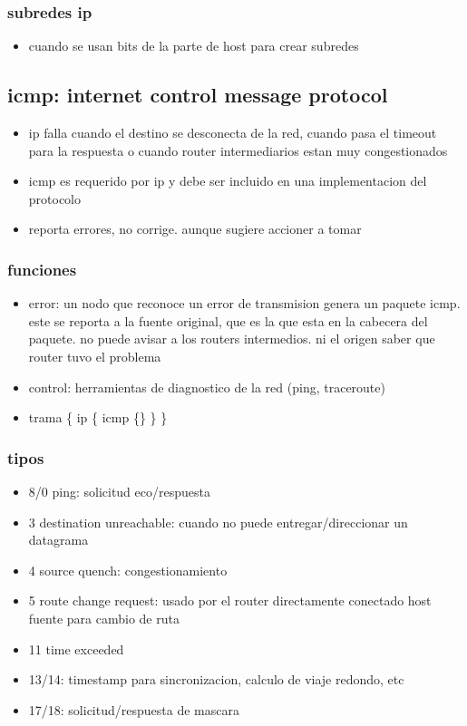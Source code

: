 \documentclass[11pt]{article}
\begin{document}
\subsubsection{subredes ip}
\label{sec:org59503a3}
\begin{itemize}
\item cuando se usan bits de la parte de host para crear subredes
\end{itemize}
\subsection{icmp: internet control message protocol}
\label{sec:org0bc4e59}
\begin{itemize}
\item ip falla cuando el destino se desconecta de la red, cuando pasa el timeout para la respuesta o cuando router intermediarios estan muy congestionados
\item icmp es requerido por ip y debe ser incluido en una implementacion del protocolo
\item reporta errores, no corrige. aunque sugiere accioner a tomar
\end{itemize}
\subsubsection{funciones}
\label{sec:org41250b2}
\begin{itemize}
\item error: un nodo que reconoce un error de transmision genera un paquete icmp. este se reporta a la fuente original, que es la que esta en la cabecera del paquete. no puede avisar a los routers intermedios. ni el origen saber que router tuvo el problema
\item control: herramientas de diagnostico de la red (ping, traceroute)
\item trama \{ ip \{ icmp \{\} \} \}
\end{itemize}
\subsubsection{tipos}
\label{sec:orgefb6a97}
\begin{itemize}
\item 8/0 ping: solicitud eco/respuesta
\item 3 destination unreachable: cuando no puede entregar/direccionar un datagrama
\item 4 source quench: congestionamiento
\item 5 route change request: usado por el router directamente conectado host fuente para cambio de ruta
\item 11 time exceeded
\item 13/14: timestamp para sincronizacion, calculo de viaje redondo, etc
\item 17/18: solicitud/respuesta de mascara
\end{itemize}
\end{document}
